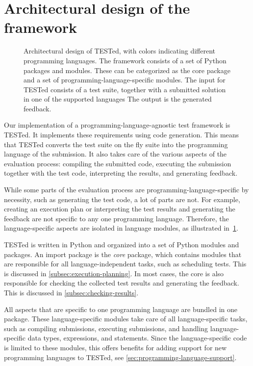 \documentclass[../main]{subfiles}
\begin{document}
\section{Architectural design of the framework}\label{sec:conceptual design}

\begin{figure}[t]
    \centering
    
    \caption{
        Architectural design of TESTed, with colors indicating different programming languages.
        The framework consists of a set of Python packages and modules.
        These can be categorized as the core package and a set of programming-language-specific modules.
        The input for TESTed consists of a test suite, together with a submitted solution in one of the supported languages
        The output is the generated feedback.
    }
    \label{fig:conceptual-design}
\end{figure}

Our implementation of a programming-language-agnostic test framework is TESTed.
It implements these requirements using code generation.
This means that TESTed converts the test suite on the fly suite into the programming language of the submission.
It also takes care of the various aspects of the evaluation process: compiling the submitted code, executing the submission together with the test code, interpreting the results, and generating feedback.

While some parts of the evaluation process are programming-language-specific by necessity, such as generating the test code, a lot of parts are not.
For example, creating an execution plan or interpreting the test results and generating the feedback are not specific to any one programming language.
Therefore, the language-specific aspects are isolated in language modules, as illustrated in~\cref{fig:conceptual-design}.

\leavevmode{}%
TESTed is written in Python and organized into a set of Python modules and packages.
An import package is the \emph{core} package, which contains modules that are responsible for all language-independent tasks, such as scheduling tests.
This is discussed in \cref{subsec:execution-planning}.
In most cases, the core is also responsible for checking the collected test results and generating the feedback.
This is discussed in \cref{subsec:checking-results}.

All aspects that are specific to one programming language are bundled in one package.
These language-specific modules take care of all language-specific tasks, such as compiling submissions, executing submissions, and handling language-specific data types, expressions, and statements.
Since the language-specific code is limited to these modules, this offers benefits for adding support for new programming languages to TESTed, see \cref{sec:programming-language-support}.
\end{document}
